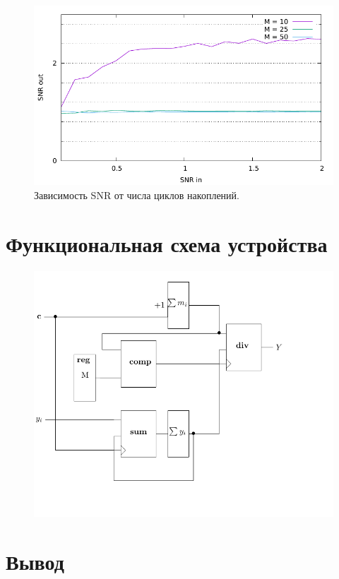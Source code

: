 \documentclass[12pt, a4paper] {ncc}
\begin{document}
        \begin{figure}[H]
            \centering
            \includegraphics[scale=0.9,page=1]{nonstat_by_snr.pdf}
            \caption{Зависимость SNR от числа циклов накоплений.}
        \end{figure}

\section*{Функциональная схема устройства}
        \begin{figure}[H]
            \centering
            \includegraphics[scale=0.9,page=1]{ffbd.pdf}
        \end{figure}
\section*{Вывод}
\end{document}
